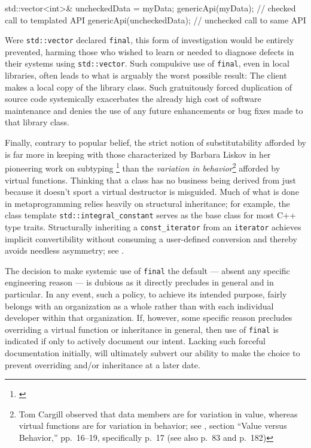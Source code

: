 {\begin{emcppslisting}
{    std::vector<int>&  uncheckedData = myData;
    genericApi(myData);        // checked call to templated API
    genericApi(uncheckedData); // unchecked call to same API
}
\end{emcppslisting}
    

\noindent Were \lstinline!std::vector! declared \lstinline!final!, this form of
investigation would be entirely prevented, harming those who wished to
learn or needed to diagnose defects in their systems using
\lstinline!std::vector!. Such compulsive use of \lstinline!final!, even in
local libraries, often leads to what is arguably the worst possible
result: The client makes a local copy of the library class. Such
gratuitously forced duplication of source code systemically exacerbates
the already high cost of software maintenance and denies the use of any
future enhancements or bug fixes made to that library class.

Finally, contrary to popular belief, the strict notion of
substitutability afforded by  is far more
in keeping with those characterized by Barbara Liskov in her pioneering
work on subtyping {\cprotect\footnote{\cite{liskov87}}} than the
\emph{variation in behavior}{\cprotect\footnote{Tom Cargill observed
that data members are for variation in value, whereas virtual
functions are for variation in behavior; see \cite{cargill92}, section ``Value versus
Behavior,'' pp.~16--19, specifically p.~17 (see also p.~83 and p.~182)}}
 afforded by virtual functions. Thinking that a
class has no business being derived from just because it doesn't sport a
virtual destructor is misguided. Much of what is done in metaprogramming
relies heavily on structural inheritance; for example, the class
template \lstinline!std::integral_constant! serves as the base class for
most C++ type traits. Structurally inheriting a \lstinline!const_iterator!
from an \lstinline!iterator! achieves implicit convertibility without
consuming a user-defined conversion and thereby avoids needless
asymmetry; see .

The decision to make systemic use of \lstinline!final! the default ---
absent any specific engineering reason --- is dubious as it directly
precludes  in general and  in
particular. In any event, such a policy, to achieve its intended
purpose, fairly belongs with an organization as a whole rather than with
each individual developer within that organization. If, however, some
specific reason precludes overriding a virtual function or inheritance
in general, then use of \lstinline!final! is indicated if only to actively
document our intent. Lacking such forceful documentation initially,
 will ultimately subvert our ability to make the
choice to prevent overriding and/or inheritance at a later date.

}
